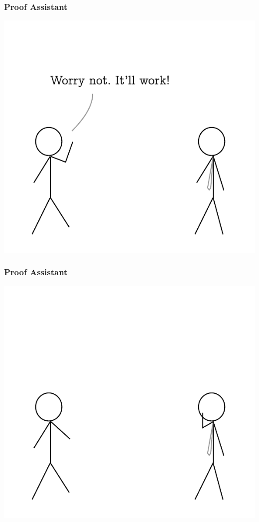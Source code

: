 \documentclass{beamer}
\begin{document}
  \begin{frame}
    \frametitle{Proof Assistant}
    \centering
    \includegraphics[scale=0.8]{images/5.pdf}
  \end{frame}
  \begin{frame}
    \frametitle{Proof Assistant}
    \centering
    \includegraphics[scale=0.8]{images/6.pdf}
  \end{frame}
\end{document}
